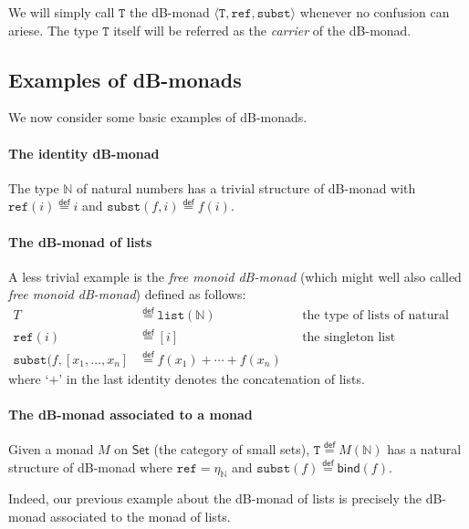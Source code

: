 \documentclass[a4paper,twoside,12pt]{article}
\theoremstyle{definition}
\theoremstyle{remark}
\newcommand{\NN}{\mathbb{N}}
\newcommand{\subst}{\mathtt{subst}}
\newcommand{\refe}{\mathtt{ref}}
\newcommand{\TT}{\mathtt{T}}
\begin{document}
We will simply call $\TT$ the dB-monad
$\langle \TT, \refe, \subst \rangle$ whenever no confusion can ariese.
The type $\TT$ itself will be referred as the \emph{carrier} of the
dB-monad.

\subsection{Examples of dB-monads}
\label{sec:examples-dB-monads}

We now consider some basic examples of dB-monads.

\paragraph{The identity dB-monad}

The type $\NN$ of natural numbers has a trivial structure of dB-monad
with $\refe(i) \stackrel{\mathsf{def}}{=} i$ and
$\subst(f,i) \stackrel{\mathsf{def}}{=} f(i)$.

\paragraph{The dB-monad of lists}

A less trivial example is the \emph{free monoid dB-monad} (which might
well also called \emph{free monoid dB-monad}) defined as follows:
\begin{align*}
T &\stackrel{\mathsf{def}}{=}\mathtt{list}(\NN) && \text{the type of lists of natural numbers} \\
\refe(i) &\stackrel{\mathsf{def}}{=} [i] &&\text{the singleton list} \\
\subst(f,[x_1, \dots, x_n] &\stackrel{\mathsf{def}}{=} f(x_1) + \cdots + f(x_n)
\end{align*}
where `$+$' in the last identity denotes the concatenation of lists.

\paragraph{The dB-monad associated to a monad}

Given a monad $M$ on $\mathsf{Set}$ (the category of small sets),
$\TT \stackrel{\mathsf{def}}{=} M(\NN)$ has a natural structure of
dB-monad where $\refe = \eta_\NN$ and
$\subst(f) \stackrel{\mathsf{def}}{=} \mathsf{bind}(f)$.

Indeed, our previous example about the dB-monad of lists is precisely
the dB-monad associated to the monad of lists.
\end{document}
